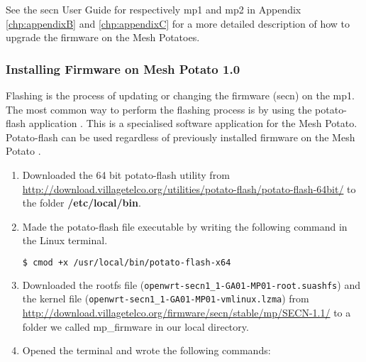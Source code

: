 See the \gls{secn} User Guide for respectively \gls{mp1} and \gls{mp2} in Appendix \ref{chp:appendixB} and \ref{chp:appendixC} for a more detailed description of how to upgrade the firmware on the Mesh Potatoes.

\subsubsection{Installing Firmware on Mesh Potato 1.0}
Flashing is the process of updating or changing the firmware (\gls{secn}) on the \gls{mp1}. The most common way to perform the flashing process is by using the potato-flash application \cite{flashing}. This is a specialised software application for the Mesh Potato. Potato-flash can be used regardless of previously installed firmware on the Mesh Potato \cite{InstallingSecnFirmware}. 

\begin{enumerate}
\item Downloaded the 64 bit potato-flash utility from \url{http://download.villagetelco.org/utilities/potato-flash/potato-flash-64bit/} to the folder \textbf{/etc/local/bin}.
\item Made the potato-flash file executable by writing the following command in the Linux terminal.
\begin{lstlisting}[language=bash]
  $ cmod +x /usr/local/bin/potato-flash-x64
\end{lstlisting}
\item Downloaded the rootfs file (\texttt{openwrt-secn1_1-GA01-MP01-root.suashfs}) and the kernel file (\texttt{openwrt-secn1_1-GA01-MP01-vmlinux.lzma})  from \url{http://download.villagetelco.org/firmware/secn/stable/mp/SECN-1.1/} to a folder we called mp\_firmware in our local directory.
\item Opened the terminal and wrote the following commands: 
\end{enumerate}


